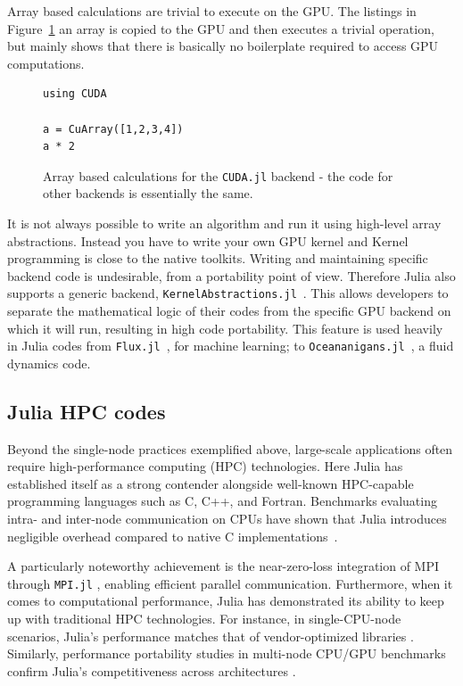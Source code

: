 \documentclass{webofc}
\begin{document}
Array based calculations are trivial to execute on the GPU. The listings in
Figure~\ref{code:arraysgpu} an array is copied to the GPU and then executes a
trivial operation, but mainly shows that there is basically no boilerplate required to access GPU computations. 

\begin{figure}[!ht]
\begin{center}
\begin{verbatim}
using CUDA

a = CuArray([1,2,3,4])
a * 2
\end{verbatim}
\caption{Array based calculations for the \texttt{CUDA.jl} backend - the code for other backends is essentially the same.}
\label{code:arraysgpu}
\end{center}
\end{figure}

It is not always possible to write an algorithm and run it using high-level
array abstractions. Instead you have to write your own GPU kernel and Kernel
programming is close to the native toolkits.  Writing and maintaining specific
backend code is undesirable, from a portability point of view. Therefore Julia
also supports a generic backend,
\texttt{KernelAbstractions.jl}~\cite{BESARD201929,8471188}. This allows
developers to separate the mathematical logic of their codes from the specific
GPU backend on which it will run, resulting in high code portability. This
feature is used heavily in Julia codes from \texttt{Flux.jl}~\cite{innes:2018},
for machine learning; to
\texttt{Oceananigans.jl}~\cite{Ramadhan_Oceananigans_jl_Fast_and_2020}, a fluid
dynamics code.

\subsection{Julia HPC codes}
\label{sec:julia-hpc}
Beyond the single-node practices exemplified above, large-scale applications often require high-performance computing (HPC) technologies. Here Julia has established itself as a strong contender alongside well-known HPC-capable programming languages such as C, C++, and Fortran. Benchmarks evaluating intra- and inter-node communication on CPUs have shown that Julia introduces negligible overhead compared to native C implementations~\cite{hunold2020benchmarking}. 

A particularly noteworthy achievement is the near-zero-loss integration of MPI through \texttt{MPI.jl} \cite{byrne2021mpi}, enabling efficient parallel communication. Furthermore, when it comes to computational performance, Julia has demonstrated its ability to keep up with traditional HPC technologies. For instance, in single-CPU-node scenarios, Julia's performance matches that of vendor-optimized libraries \cite{giordano2022productivity}. Similarly, performance portability studies in multi-node CPU/GPU benchmarks confirm Julia's competitiveness across architectures \cite{teichgraber2022julia,godoy2023evaluating}.
\end{document}
